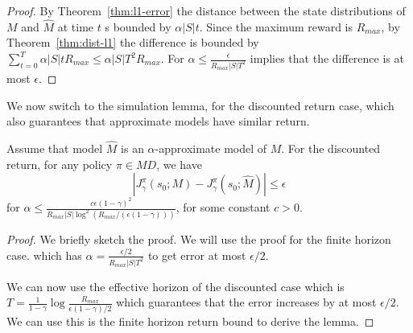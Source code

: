 \begin{proof}
By Theorem~\ref{thm:l1-error} the distance between the state distributions of
$M$ and $\widehat{M}$ at time $t$ s bounded by $\alpha|S|t$. Since the maximum
reward  is $R_{max}$, by
Theorem~\ref{thm:dist-l1} the difference is bounded by
$\sum_{t=0}^T \alpha|S|t R_{max}\leq \alpha|S|T^2 R_{max}$. For $\alpha\leq \frac{\epsilon}{R_{max}|S|
T^2}$ implies that the difference is at most $\epsilon$.
\end{proof}



We now switch to the simulation lemma, for the discounted return
case, which also guarantees that approximate models have similar
return.

\begin{lemma}
Assume that model $\widehat{M}$ is an $\alpha$-approximate model of $M$.
For the discounted return, for any policy $\pi \in MD$, we have
\[
|J^\pi_\gamma(s_0;M)-J^\pi_\gamma(s_0;\widehat{M})|\leq \epsilon
\]
for $\alpha\leq \frac{c \epsilon(1-\gamma)^2}{R_{max}|S|
\log^2(R_{max}/(\epsilon(1-\gamma)))}$, for some constant $c>0$.
\end{lemma}

\begin{proof} We briefly sketch the proof.
We will use the proof for the finite horizon case. which has
$\alpha=\frac{\epsilon/2}{R_{max}|S| T^2}$ to get error at most
$\epsilon/2$.

We can now use the effective horizon of the discounted case which is
$T=\frac{1}{1-\gamma}\log\frac{R_{max}}{\epsilon(1-\gamma)/2}$ which
guarantees that the error increases by at most $\epsilon/2$. We can
use this is the finite horizon return bound to derive the lemma.
\end{proof}

